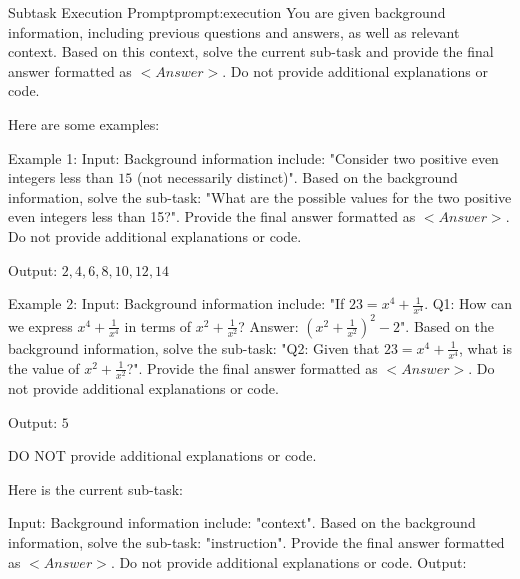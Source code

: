 \documentclass{article}
\begin{document}
\begin{promptbox}{Subtask Execution Prompt}{prompt:execution}
You are given background information, including previous questions and answers, as well as relevant context. Based on this context, solve the current sub-task and provide the final answer formatted as $\boxed{<Answer>}$. Do not provide additional explanations or code.

Here are some examples:

Example 1:
Input: Background information include: "Consider two positive even integers less than $15$ (not necessarily distinct)". Based on the background information, solve the sub-task: "What are the possible values for the two positive even integers less than 15?". Provide the final answer formatted as $\boxed{<Answer>}$. Do not provide additional explanations or code.

Output: $\boxed{2, 4, 6, 8, 10, 12, 14}$

Example 2:
Input: Background information include: "If $23=x^4+\frac{1}{x^4}$. Q1: How can we express $x^4 + \frac{1}{x^4}$ in terms of $x^2 + \frac{1}{x^2}$? Answer: $\boxed{(x^2 + \frac{1}{x^2})^2 - 2}$". Based on the background information, solve the sub-task: "Q2: Given that $23 = x^4 + \frac{1}{x^4}$, what is the value of $x^2 + \frac{1}{x^2}$?". Provide the final answer formatted as $\boxed{<Answer>}$. Do not provide additional explanations or code.

Output: $\boxed{5}$

DO NOT provide additional explanations or code.

Here is the current sub-task:

Input: Background information include: "{context}". 
Based on the background information, solve the sub-task: "{instruction}". 
Provide the final answer formatted as $\boxed{{<Answer>}}$. 
Do not provide additional explanations or code. Output:
\end{promptbox}
\end{document}
